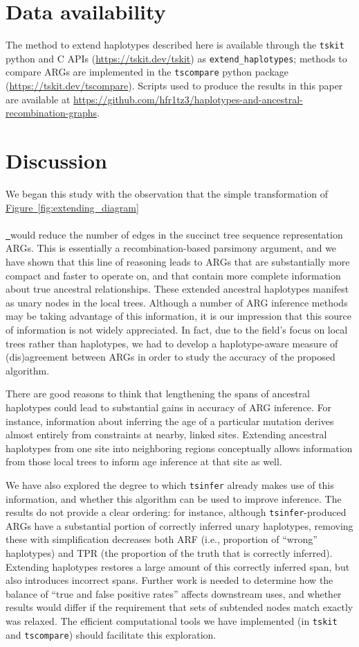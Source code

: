 \documentclass[10pt,twoside,lineno]{gsajnl}
\newcommand{\tskit}{\texttt{tskit}}
\newcommand{\tscompare}{\texttt{tscompare}}
\newcommand{\tsinfer}{\texttt{tsinfer}}
\newcommand*{\figref}[2][]{%
	\hyperref[{#2}]{%
		Figure~\ref*{#2}%
		\ifx\\#1\\%
		\else
		\,#1%
		\fi
	}%
}
\begin{document}
\section{Data availability}

The method to extend haplotypes described here is available through the \tskit{}
python and C APIs (\url{https://tskit.dev/tskit}) as \texttt{extend\_haplotypes};
methods to compare ARGs are implemented in the \tscompare{} python package
(\url{https://tskit.dev/tscompare}).
Scripts used to produce the results in this paper are available at
\url{https://github.com/hfr1tz3/haplotypes-and-ancestral-recombination-graphs}.


\section{Discussion}

We began this study with the observation that the simple transformation
of \figref{fig:extending_diagram} would reduce the number of edges
in the succinct tree sequence representation ARGs.
This is essentially a recombination-based parsimony argument,
and we have shown that this line of reasoning
leads to ARGs that are substantially more compact and faster to operate on,
and that contain more complete information about true ancestral relationships.
These extended ancestral haplotypes manifest as unary nodes in the local trees.
Although a number of ARG inference methods may be taking advantage of this information,
it is our impression that this source of information is not widely appreciated.
In fact, due to the field's focus on local trees rather than haplotypes,
we had to develop a haplotype-aware measure of (dis)agreement between ARGs in order to study the accuracy of the proposed algorithm.

There are good reasons to think that lengthening the spans of ancestral haplotypes
could lead to substantial gains in accuracy of ARG inference.
For instance, information about inferring the age of a particular mutation
derives almost entirely from constraints at nearby, linked sites.
Extending ancestral haplotypes from one site into neighboring regions
conceptually allows information from those local trees
to inform age inference at that site as well.

We have also explored the degree to which \tsinfer{} already makes use of this information,
and whether this algorithm can be used to improve inference.
The results do not provide a clear ordering:
for instance, although \tsinfer-produced ARGs
have a substantial portion of correctly inferred unary haplotypes,
removing these with simplification decreases both ARF
(i.e., proportion of ``wrong'' haplotypes)
and TPR (the proportion of the truth that is correctly inferred).
Extending haplotypes restores a large amount of this correctly inferred span,
but also introduces incorrect spans.
Further work is needed to determine how the balance of ``true and false positive rates''
affects downstream uses,
and whether results would differ if the requirement that sets of subtended nodes match exactly
was relaxed.
The efficient computational tools we have implemented (in \tskit{} and \tscompare{})
should facilitate this exploration.
\end{document}

